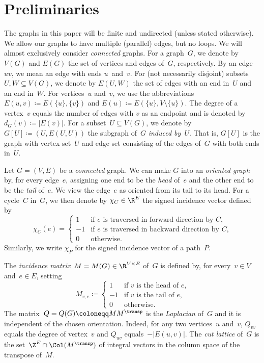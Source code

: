 \section{Preliminaries} 
The graphs in this paper will be finite and undirected (unless stated otherwise). We allow our graphs to have multiple (parallel) edges, but no loops. We will almost exclusively consider \emph{connected} graphs. For a graph~$G$, we denote by $V(G)$ and $E(G)$ the set of vertices and edges of~$G$, respectively. By an edge~$uv$, we mean an edge with ends $u$~and~$v$. For (not necessarily disjoint) subsets~$U,W\subseteq V(G)$, we denote by $E(U,W)$ the set of edges with an end in~$U$ and an end in~$W$. For vertices~$u$ and~$v$, we use the abbreviations $E(u,v)\coloneqq E(\{u\},\{v\})$ and $E(u)\coloneqq E(\{u\},V\setminus \{u\})$. The degree of a vertex~$v$ equals the number of edges with $v$ as an endpoint and is denoted by $d_G(v)\coloneqq |E(v)|$. For a subset~$U\subseteq V(G)$, we denote by $G[U]\coloneqq (U,E(U,U))$ the subgraph of~$G$ \emph{induced by~$U$}. That is, $G[U]$ is the graph with vertex set~$U$ and edge set consisting of the edges of~$G$ with both ends in~$U$.

Let $G=(V,E)$ be a \emph{connected} graph. We can make $G$ into an \emph{oriented graph} by, for every edge~$e$, assigning one end to be the \emph{head} of~$e$ and the other end to be the \emph{tail} of~$e$. We view the edge~$e$ as oriented from its tail to its head. For a cycle~$C$ in~$G$, we then denote by $\chi_C\in \R^{E}$ the signed incidence vector defined by
\begin{equation}
\chi_C(e)=\begin{cases}
1& \text{if $e$ is traversed in forward direction by $C$,}\\
-1&\text{if $e$ is traversed in backward direction by $C$,}\\
0&\text{otherwise.}
\end{cases}
\end{equation} 
Similarly, we write $\chi_P$ for the signed incidence vector of a path~$P$.

The \emph{incidence matrix}~$M=M(G)\in \R^{V\times E}$ of~$G$ is defined by, for every~$v\in V$ and~$e\in E$, setting 
\begin{equation}
M_{v,e}\coloneqq 
\begin{cases}
1&\text{if $v$ is the head of $e$,}\\
-1&\text{if $v$ is the tail of $e$,}\\
0&\text{otherwise.}
\end{cases}
\end{equation}
\noindent The matrix~$Q=Q(G)\coloneqq MM^\transp$ is the \emph{Laplacian} of~$G$ and it is independent of the chosen orientation. Indeed, for any two vertices~$u$ and~$v$, $Q_{vv}$ equals the degree of vertex~$v$ and $Q_{uv}$ equals~$-|E(u,v)|$. The \emph{cut lattice} of~$G$ is the set~$\Z^{E}\cap \Col(M^\transp)$ of integral vectors in the column space of the transpose of~$M$. 

